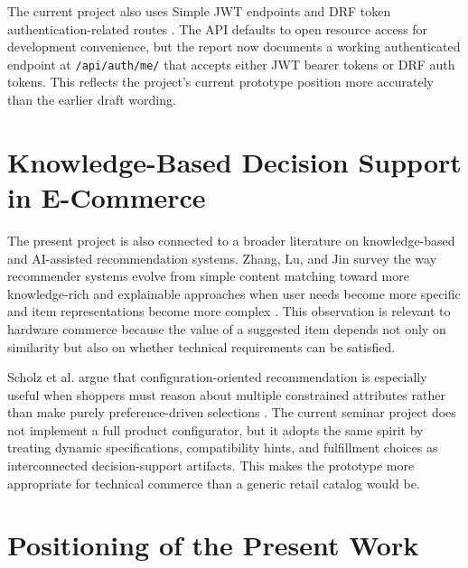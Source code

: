 \documentclass[12pt,letterpaper,oneside,openany]{book}
\begin{document}
\begin{justifying}
The current project also uses Simple JWT endpoints and DRF token
authentication-related routes \cite{simplejwt-docs}. The API defaults to open
resource access for development convenience, but the report now documents a
working authenticated endpoint at \texttt{/api/auth/me/} that accepts either
JWT bearer tokens or DRF auth tokens. This reflects the project's current
prototype position more accurately than the earlier draft wording.
\end{justifying}

\section{Knowledge-Based Decision Support in E-Commerce}

\begin{justifying}
The present project is also connected to a broader literature on
knowledge-based and AI-assisted recommendation systems. Zhang, Lu, and Jin
survey the way recommender systems evolve from simple content matching toward
more knowledge-rich and explainable approaches when user needs become more
specific and item representations become more complex \cite{zhang-ai-rec}. This
observation is relevant to hardware commerce because the value of a suggested
item depends not only on similarity but also on whether technical requirements
can be satisfied.
\end{justifying}

\begin{justifying}
Scholz et al. argue that configuration-oriented recommendation is especially
useful when shoppers must reason about multiple constrained attributes rather
than make purely preference-driven selections \cite{scholz-config}. The current
seminar project does not implement a full product configurator, but it adopts
the same spirit by treating dynamic specifications, compatibility hints, and
fulfillment choices as interconnected decision-support artifacts. This makes
the prototype more appropriate for technical commerce than a generic retail
catalog would be.
\end{justifying}

\section{Positioning of the Present Work}
\end{document}
